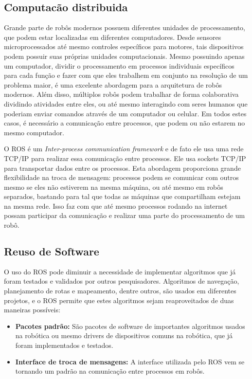 \subsection{Computacão distribuida}
Grande parte de robôs modernos possuem diferentes unidades de processamento, que podem estar localizadas em diferentes computadores. Desde sensores microprocessados até mesmo controles específicos para motores, tais dispositivos podem possuir suas próprias unidades computacionais. Mesmo possuindo apenas um computador, dividir o processamento em processos individuais específicos para cada função e fazer com que eles trabalhem em conjunto na resolução de um problema maior, é uma excelente abordagem para a arquitetura de robôs modernos. Além disso, múltiplos robôs podem trabalhar de forma colaborativa dividindo atividades entre eles, ou até mesmo interagindo com seres humanos que poderiam enviar comandos através de um computador ou celular. Em todos estes casos, é necessário a comunicação entre processos, que podem ou não estarem no mesmo computador. 

O ROS é um \textit{Inter-process communication framework} e de fato ele usa uma rede TCP/IP para realizar essa comunicação entre processos. Ele usa sockets TCP/IP para transportar dados entre os processos. Esta abordagem proporciona grande flexibilidade na troca de mensagem: processos podem se comunicar com outros mesmo se eles não estiverem na mesma máquina, ou até mesmo em robôs separados, bastando para tal que todas as máquinas que compartilham estejam na mesma rede. Isso faz com que até mesmo processos rodando na internet possam participar da comunicação e realizar uma parte do processamento de um robô.


\subsection{Reuso de Software}
O uso do ROS pode diminuir a necessidade de implementar algoritmos que já foram testados e validados por outros pesquisadores. Algoritmos de navegação, planejamento de rotas e mapeamento, dentre outros, são usados em diferentes projetos, e o ROS permite que estes algoritmos sejam reaproveitados de duas maneiras possíveis:

\begin{itemize}
    \item \textbf{Pacotes padrão:} São pacotes de software de importantes algoritmos usados na robótica ou mesmo drivers de dispositivos comuns na robótica, que já foram implementados e testados.

    \item \textbf{Interface de troca de mensagens:} A interface utilizada pelo ROS vem se tornando um padrão na comunicação entre processos em robôs.
\end{itemize}

